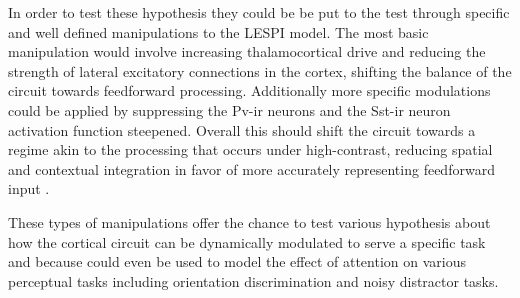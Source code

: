 In order to test these hypothesis they could be be put to the test
through specific and well defined manipulations to the LESPI
model. The most basic manipulation would involve increasing
thalamocortical drive and reducing the strength of lateral excitatory
connections in the cortex, shifting the balance of the circuit towards
feedforward processing. Additionally more specific modulations could
be applied by suppressing the Pv-ir neurons and the Sst-ir neuron
activation function steepened. Overall this should shift the circuit
towards a regime akin to the processing that occurs under
high-contrast, reducing spatial and contextual integration in favor of
more accurately representing feedforward input \citep{Roberts2005,
  Roberts2008a, Roberts2008b}.

These types of manipulations offer the chance to test various
hypothesis about how the cortical circuit can be dynamically modulated
to serve a specific task and because could even be used to model the
effect of attention on various perceptual tasks including orientation
discrimination and noisy distractor tasks.
